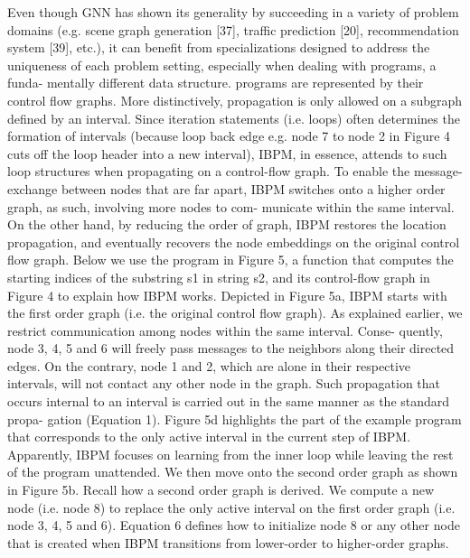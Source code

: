 \documentclass{article}
\begin{document}
Even though GNN has shown its generality by succeeding in a variety of problem domains (e.g. scene graph generation [37], traffic prediction [20], recommendation system [39], etc.), it can benefit from specializations designed to address the uniqueness of each problem setting, especially when dealing with programs, a funda- mentally different data structure. programs are represented by their control flow graphs. More distinctively, propagation is only allowed on a subgraph defined by an interval. Since iteration statements (i.e. loops) often determines the formation of intervals (because loop back edge e.g. node 7 to node 2 in Figure 4 cuts off the loop header into a new interval), IBPM, in essence, attends to such loop structures when propagating on a control-flow graph. To enable the message-exchange between nodes that are far apart, IBPM switches onto a higher order graph, as such, involving more nodes to com- municate within the same interval. On the other hand, by reducing the order of graph, IBPM restores the location propagation, and eventually recovers the node embeddings on the original control flow graph. Below we use the program in Figure 5, a function that computes the starting indices of the substring s1 in string s2, and its control-flow graph in Figure 4 to explain how IBPM works.
Depicted in Figure 5a, IBPM starts with the first order graph (i.e. the original control flow graph). As explained earlier, we restrict communication among nodes within the same interval. Conse- quently, node 3, 4, 5 and 6 will freely pass messages to the neighbors along their directed edges. On the contrary, node 1 and 2, which are alone in their respective intervals, will not contact any other node in the graph. Such propagation that occurs internal to an interval is carried out in the same manner as the standard propa- gation (Equation 1). Figure 5d highlights the part of the example program that corresponds to the only active interval in the current step of IBPM. Apparently, IBPM focuses on learning from the inner loop while leaving the rest of the program unattended.
We then move onto the second order graph as shown in Figure 5b. Recall how a second order graph is derived. We compute a new node (i.e. node 8) to replace the only active interval on the first order graph (i.e. node 3, 4, 5 and 6). Equation 6 defines how to initialize node 8 or any other node that is created when IBPM transitions from lower-order to higher-order graphs.
\end{document}
